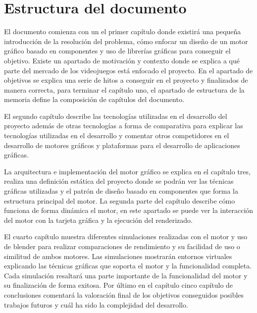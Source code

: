 \documentclass[a4paper, 17pt]{book}
\begin{document}
\section{Estructura del documento}
\label{sec:estructura}

El documento comienza con un el primer capítulo donde existirá una pequeña introducción de la resolución 
del problema, cómo enfocar un diseño de un motor gráfico basado en componentes y uso de librerías gráficas
para conseguir el objetivo. Existe un apartado de motivación y contexto donde se explica a qué parte del
mercado de los videojuegos está enfocado el proyecto. En el apartado de objetivos se explica una serie de
hitos a conseguir en el proyecto y finalizados de manera correcta, para terminar el capítulo uno, el
apartado de estructura de la memoria define la composición de capítulos del documento.

\vspace{1mm} %

El segundo capítulo describe las tecnologías utilizadas en el desarrollo del proyecto además de otras
tecnologías a forma de comparativa para explicar las tecnologías utilizadas en el desarrollo y comentar
otros competidores en el desarrollo de motores gráficos y plataformas para el desarrollo de aplicaciones gráficas. 

\vspace{1mm} %

La arquitectura e implementación del motor gráfico se explica en el capítulo tres, realiza una definición
estática del proyecto donde se podrán ver las técnicas gráficas utilizadas y el patrón de diseño basado en
componentes que forma la estructura principal del motor. La segunda parte del capítulo describe cómo
funciona de forma dinámica el motor, en este apartado se puede ver la interacción del motor con la tarjeta
gráfica y la ejecución del renderizado.

\vspace{1mm} %

El cuarto capítulo muestra diferentes simulaciones realizadas con el motor y uso de blender para realizar
comparaciones de rendimiento y su facilidad de uso o similitud de ambos motores. Las simulaciones mostrarán
entornos virtuales explicando las técnicas gráficas que soporta el motor y la funcionalidad completa.
Cada simulación resaltará una parte importante de la funcionalidad del motor y su finalización de forma exitosa.
Por último en el capítulo cinco capítulo de conclusiones comentará la valoración final de los objetivos
conseguidos posibles trabajos futuros y cuál ha sido la complejidad del desarrollo.
\end{document}
